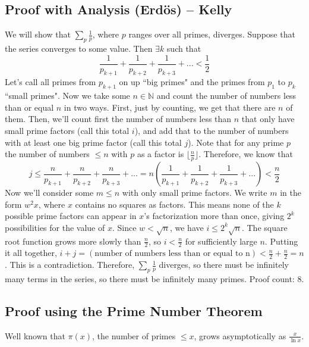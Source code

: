 \documentclass[12pt]{scrartcl}
\begin{document}
\subsection*{Proof with Analysis (Erd\"os) -- Kelly}
We will show that $\sum_{p}{\frac{1}{p}}$, where $p$ ranges over all primes, diverges. Suppose that the series converges to some value. Then $\exists k $ such that $$\frac{1}{p_{k+1}} + \frac{1}{p_{k+2}} + \frac{1}{p_{k+3}} + ... < \frac{1}{2}$$
Let's call all primes from $p_{k+1}$ on up ``big primes" and the primes from $p_1$ to $p_k$ ``small primes". Now we take some $n \in \mathbb{N}$ and count the number of numbers less than or equal $n$ in two ways. First, just by counting, we get that there are $n$ of them. Then, we'll count first the number of numbers less than $n$ that only have small prime factors (call this total $i$), and add that to the number of numbers with at least one big prime factor (call this total $j$). Note that for any prime $p$ the number of numbers $\leq n$ with $p$ as a factor is $\lfloor \frac{n}{p} \rfloor$. Therefore, we know that $$ j \leq \frac{n}{p_{k+1}} + \frac{n}{p_{k+2}} + \frac{n}{p_{k+3}} + ... = n(\frac{1}{p_{k+1}} + \frac{1}{p_{k+2}} + \frac{1}{p_{k+3}} + ...) < \frac{n}{2}$$
Now we'll consider some $m \leq n$ with only small prime factors. We write $m$ in the form $w^2x$, where $x$ contains no squares as factors. This means none of the $k$ possible prime factors can appear in $x$'s factorization more than once, giving $2^k$ possibilities for the value of $x$. Since $w < \sqrt{n}$, we have $ i \leq 2^k \sqrt{n}$. The square root function grows more slowly than $\frac{n}{2}$, so $i < \frac{n}{2}$ for sufficiently large $n$. Putting it all together, $i+j = (\textrm{number of numbers less than or equal to n}) < \frac{n}{2} + \frac{n}{2} = n$. This is a contradiction. Therefore, $\sum_{p}{\frac{1}{p}}$ diverges, so there must be infinitely many terms in the series, so there must be infinitely many primes. Proof count: $8$.

\subsection*{Proof using the Prime Number Theorem }
Well known that $\pi(x)$, the number of primes $\leq x$, grows asymptotically as $\frac x{\ln x}$.
\end{document}
